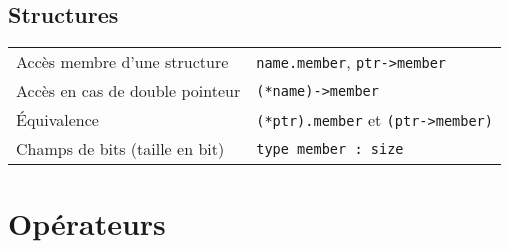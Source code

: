 \documentclass{article}
\newcommand{\cd}{\lstinline}
\begin{document}
\begin{multicols*}{3}
\subsection*{Structures}
\begin{tabularx}{\linewidth}{Xl}
  Accès membre d'une structure & \cd{name.member}, \cd{ptr->member} \\
  Accès en cas de double pointeur & \cd{(*name)->member} \\
  Équivalence & \cd{(*ptr).member} et \cd{(ptr->member)}  \\
  Champs de bits (taille en bit) & \cd{type member : size} \\
\end{tabularx}

\section*{Opérateurs}


\end{multicols*}
\end{document}
